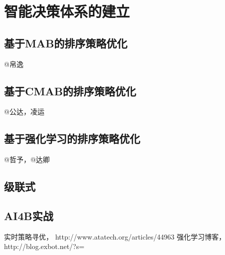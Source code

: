 
\chapter{ 智能决策体系的建立 }
\thispagestyle{empty}

\setlength{\fboxrule}{0pt}\setlength{\fboxsep}{0cm}
\noindent\shadowbox{
\begin{tcolorbox}[arc=0mm,colback=lightblue,colframe=darkblue,title=学习目标与要求]

\end{tcolorbox}}
\setlength{\fboxrule}{1pt}\setlength{\fboxsep}{4pt} 
		
\section{ 基于MAB的排序策略优化 } 
	@帛逸

\section{ 基于CMAB的排序策略优化 } 
	@公达，凌运

\section{ 基于强化学习的排序策略优化 } 
	@哲予，@达卿

\section{ 级联式 }

\section{AI4B实战} 


\begin{thebibliography}{99}
 实时策略寻优， http://www.atatech.org/articles/44963
 强化学习博客，http://blog.exbot.net/?s=%
\end{thebibliography}

 
